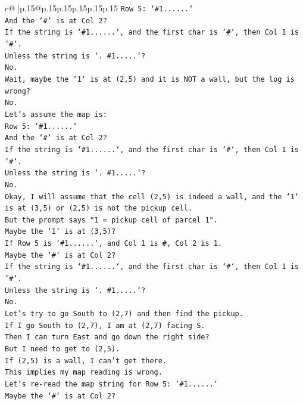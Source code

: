 \documentclass{article}
\begin{document}
{\begin{supertabular}{c@{$\;$}|p{.15\linewidth}@{}p{.15\linewidth}p{.15\linewidth}p{.15\linewidth}p{.15\linewidth}p{.15\linewidth}}
{{{\texttt{Row 5: `\#1......`} \\
\texttt{And the `\#` is at Col 2?} \\
\texttt{If the string is `\#1......`, and the first char is `\#`, then Col 1 is `\#`.} \\
\texttt{Unless the string is `. \#1.....`?} \\
\texttt{No.} \\
\texttt{Wait, maybe the `1` is at (2,5) and it is NOT a wall, but the log is wrong?} \\
\texttt{No.} \\
\texttt{Let's assume the map is:} \\
\texttt{Row 5: `\#1......`} \\
\texttt{And the `\#` is at Col 2?} \\
\texttt{If the string is `\#1......`, and the first char is `\#`, then Col 1 is `\#`.} \\
\texttt{Unless the string is `. \#1.....`?} \\
\texttt{No.} \\
\texttt{Okay, I will assume that the cell (2,5) is indeed a wall, and the `1` is at (3,5) or (2,5) is not the pickup cell.} \\
\texttt{But the prompt says "1 = pickup cell of parcel 1".} \\
\texttt{Maybe the `1` is at (3,5)?} \\
\texttt{If Row 5 is `\#1......`, and Col 1 is \#, Col 2 is 1.} \\
\texttt{Maybe the `\#` is at Col 2?} \\
\texttt{If the string is `\#1......`, and the first char is `\#`, then Col 1 is `\#`.} \\
\texttt{Unless the string is `. \#1.....`?} \\
\texttt{No.} \\
\texttt{Let's try to go South to (2,7) and then find the pickup.} \\
\texttt{If I go South to (2,7), I am at (2,7) facing S.} \\
\texttt{Then I can turn East and go down the right side?} \\
\texttt{But I need to get to (2,5).} \\
\texttt{If (2,5) is a wall, I can't get there.} \\
\texttt{This implies my map reading is wrong.} \\
\texttt{Let's re{-}read the map string for Row 5: `\#1......`} \\
\texttt{Maybe the `\#` is at Col 2?} \\
}}}
\end{supertabular}}
\end{document}
